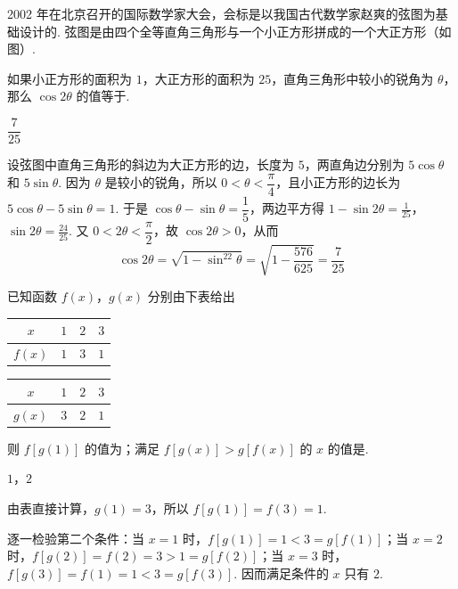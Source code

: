 \begin{problem}
2002 年在北京召开的国际数学家大会，会标是以我国古代数学家赵爽的弦图为基础设计的. 弦图是由四个全等直角三角形与一个小正方形拼成的一个大正方形（如图）.


如果小正方形的面积为 \(1\)，大正方形的面积为 \(25\)，直角三角形中较小的锐角为 \(\theta\)，那么 \(\cos 2\theta\) 的值等于\fillinblank{}.
\end{problem}

\begin{answer}
\(\dfrac{7}{25}\)
\end{answer}

\begin{solution}
设弦图中直角三角形的斜边为大正方形的边，长度为 \(5\)，两直角边分别为 \(5\cos\theta\) 和 \(5\sin\theta\). 因为 \(\theta\) 是较小的锐角，所以 \(0<\theta<\dfrac\pi4\)，且小正方形的边长为
\(5\cos\theta-5\sin\theta=1\).
于是 \(\cos\theta-\sin\theta=\dfrac15\)，两边平方得
\(1-\sin2\theta=\frac1{25}\)，\(\sin2\theta=\frac{24}{25}\).
又 \(0<2\theta<\dfrac\pi2\)，故 \(\cos2\theta>0\)，从而
\[
\cos2\theta=\sqrt{1-\sin^22\theta}
=\sqrt{1-\frac{576}{625}}=\frac7{25}
\]
\end{solution}

\begin{problem}
已知函数 \(f(x)\)，\(g(x)\) 分别由下表给出

\begin{center}
\begin{tabular}{c|ccc}
\(x\) & \(1\) & \(2\) & \(3\) \\
\hline
\(f(x)\) & \(1\) & \(3\) & \(1\)
\end{tabular}
\hspace{1.5em}
\begin{tabular}{c|ccc}
\(x\) & \(1\) & \(2\) & \(3\) \\
\hline
\(g(x)\) & \(3\) & \(2\) & \(1\)
\end{tabular}
\end{center}

则 \(f[g(1)]\) 的值为\fillinblank{}；满足 \(f[g(x)] > g[f(x)]\) 的 \(x\) 的值是\fillinblank{}.
\end{problem}

\begin{answer}
\(1\)，\(2\)
\end{answer}

\begin{solution}
由表直接计算，\(g(1)=3\)，所以 \(f[g(1)]=f(3)=1\).

逐一检验第二个条件：当 \(x=1\) 时，\(f[g(1)]=1<3=g[f(1)]\)；当 \(x=2\) 时，\(f[g(2)]=f(2)=3>1=g[f(2)]\)；当 \(x=3\) 时，\(f[g(3)]=f(1)=1<3=g[f(3)]\). 因而满足条件的 \(x\) 只有 \(2\).
\end{solution}

